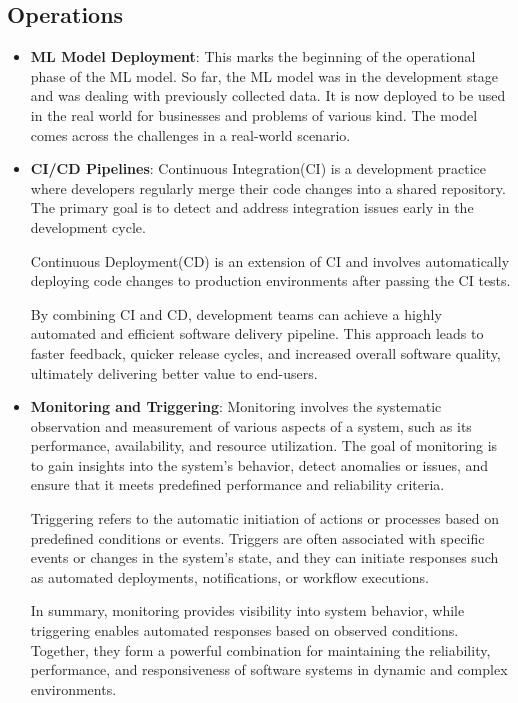 \documentclass[12pt]{article}
\begin{document}
\subsection{Operations}
\begin{itemize}
    \item \textbf{ML Model Deployment}: This marks the beginning of the operational phase of the ML model. So far, the ML model was in the development stage and was dealing with previously collected data. It is now deployed to be used in the real world for businesses and problems of various kind. The model comes across the challenges in a real-world scenario.

    \item \textbf{CI/CD Pipelines}: Continuous Integration(CI) is a development practice where developers regularly merge their code changes into a shared repository. The primary goal is to detect and address integration issues early in the development cycle.

    Continuous Deployment(CD) is an extension of CI and involves automatically deploying code changes to production environments after passing the CI tests. 

    By combining CI and CD, development teams can achieve a highly automated and efficient software delivery pipeline. This approach leads to faster feedback, quicker release cycles, and increased overall software quality, ultimately delivering better value to end-users.

    \item \textbf{Monitoring and Triggering}: Monitoring involves the systematic observation and measurement of various aspects of a system, such as its performance, availability, and resource utilization. The goal of monitoring is to gain insights into the system's behavior, detect anomalies or issues, and ensure that it meets predefined performance and reliability criteria.

    Triggering refers to the automatic initiation of actions or processes based on predefined conditions or events. Triggers are often associated with specific events or changes in the system's state, and they can initiate responses such as automated deployments, notifications, or workflow executions.

    In summary, monitoring provides visibility into system behavior, while triggering enables automated responses based on observed conditions. Together, they form a powerful combination for maintaining the reliability, performance, and responsiveness of software systems in dynamic and complex environments.
\end{itemize}
\newpage
\end{document}
